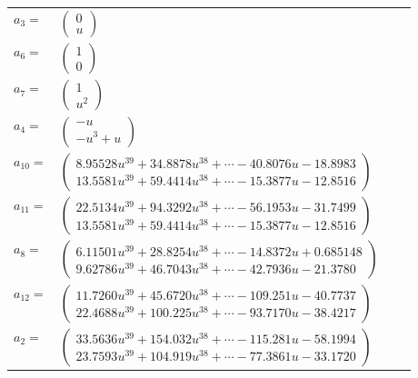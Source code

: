 \documentclass[1p]{elsarticle_modified}
\theoremstyle{definition}
\begin{document}
\begin{tabular}{m{7pt} m{180pt} m{7pt} m{180pt} }
\flushright $a_{3}=$&$\begin{pmatrix}0\\u\end{pmatrix}$ \\
\flushright $a_{6}=$&$\begin{pmatrix}1\\0\end{pmatrix}$ \\
\flushright $a_{7}=$&$\begin{pmatrix}1\\u^2\end{pmatrix}$ \\
\flushright $a_{4}=$&$\begin{pmatrix}- u\\- u^3+u\end{pmatrix}$ \\
\flushright $a_{10}=$&$\begin{pmatrix}8.95528 u^{39}+34.8878 u^{38}+\cdots-40.8076 u-18.8983\\13.5581 u^{39}+59.4414 u^{38}+\cdots-15.3877 u-12.8516\end{pmatrix}$ \\
\flushright $a_{11}=$&$\begin{pmatrix}22.5134 u^{39}+94.3292 u^{38}+\cdots-56.1953 u-31.7499\\13.5581 u^{39}+59.4414 u^{38}+\cdots-15.3877 u-12.8516\end{pmatrix}$ \\
\flushright $a_{8}=$&$\begin{pmatrix}6.11501 u^{39}+28.8254 u^{38}+\cdots-14.8372 u+0.685148\\9.62786 u^{39}+46.7043 u^{38}+\cdots-42.7936 u-21.3780\end{pmatrix}$ \\
\flushright $a_{12}=$&$\begin{pmatrix}11.7260 u^{39}+45.6720 u^{38}+\cdots-109.251 u-40.7737\\22.4688 u^{39}+100.225 u^{38}+\cdots-93.7170 u-38.4217\end{pmatrix}$ \\
\flushright $a_{2}=$&$\begin{pmatrix}33.5636 u^{39}+154.032 u^{38}+\cdots-115.281 u-58.1994\\23.7593 u^{39}+104.919 u^{38}+\cdots-77.3861 u-33.1720\end{pmatrix}$ \\

\end{tabular}
\end{document}

